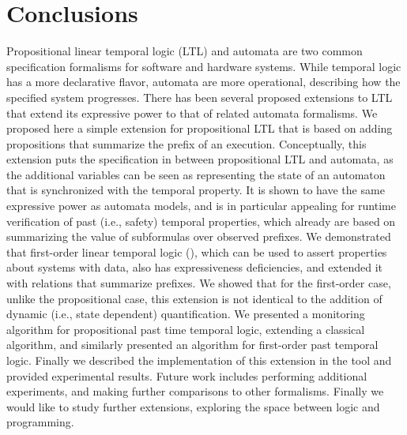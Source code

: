 
\section{Conclusions}

Propositional linear temporal logic (LTL) and automata are two common specification formalisms for software and hardware systems. While temporal logic has a more declarative
flavor, automata are more operational, describing how the specified system
progresses. There has been several proposed extensions to LTL that extend
its expressive power to that of related automata formalisms. We proposed here
a simple extension for propositional LTL that is based on adding propositions that summarize the prefix of an execution. Conceptually, this extension puts the specification in between propositional LTL and automata, as the additional
variables can be seen as representing the state of an automaton
that is synchronized with the temporal property. It is shown to have
the same expressive power as automata models, and is in particular
appealing for runtime verification of past (i.e., safety) temporal properties,
which already are based on summarizing the value of subformulas over
observed prefixes.
%
We demonstrated that first-order linear temporal logic (\FLTL{}), which
can be used to assert properties about systems with data, also has expressiveness deficiencies, and extended it with relations that summarize prefixes.
We showed that for the first-order case, unlike the propositional case,
this extension is not identical to the addition of dynamic (i.e., state dependent) quantification.
%
We presented a monitoring
algorithm for propositional past time temporal logic, extending a classical algorithm, and similarly presented an algorithm for 
first-order past temporal logic.
Finally we described the implementation of this extension in the \dejavu{} tool and provided experimental results.
%
Future work includes performing additional experiments, and making further comparisons to other formalisms. Finally we would like to study further extensions, exploring the space between logic and programming.